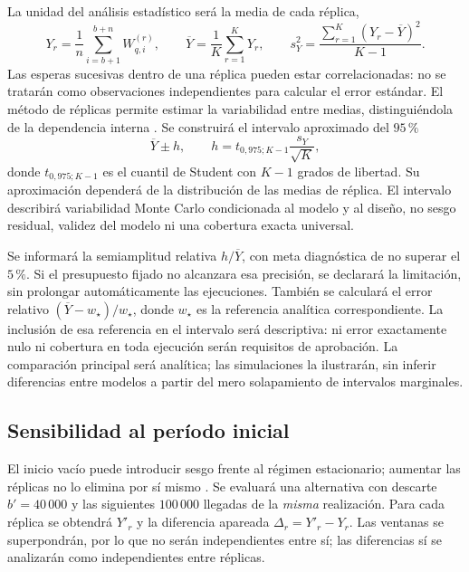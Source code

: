 La unidad del análisis estadístico será la media de cada réplica,
\begin{equation}
  Y_r=\frac{1}{n}\sum_{i=b+1}^{b+n}W_{q,i}^{(r)},\qquad
  \overline{Y}=\frac{1}{K}\sum_{r=1}^{K}Y_r,\qquad
  s_Y^2=\frac{\sum_{r=1}^{K}(Y_r-\overline{Y})^2}{K-1}.
  \label{eq:metodo-estimadores}
\end{equation}
Las esperas sucesivas dentro de una réplica pueden estar correlacionadas: no se tratarán como observaciones independientes para calcular el error estándar. El método de réplicas permite estimar la variabilidad entre medias, distinguiéndola de la dependencia interna \cite{banksAnalisisSalidas}. Se construirá el intervalo aproximado del $95\,\%$
\begin{equation}
  \overline{Y}\pm h,\qquad
  h=t_{0{,}975;K-1}\frac{s_Y}{\sqrt{K}},
  \label{eq:metodo-intervalo}
\end{equation}
donde $t_{0{,}975;K-1}$ es el cuantil de Student con $K-1$ grados de libertad. Su aproximación dependerá de la distribución de las medias de réplica. El intervalo describirá variabilidad Monte Carlo condicionada al modelo y al diseño, no sesgo residual, validez del modelo ni una cobertura exacta universal.

Se informará la semiamplitud relativa $h/\overline{Y}$, con meta diagnóstica de no superar el $5\,\%$. Si el presupuesto fijado no alcanzara esa precisión, se declarará la limitación, sin prolongar automáticamente las ejecuciones. También se calculará el error relativo $(\overline{Y}-w_\star)/w_\star$, donde $w_\star$ es la referencia analítica correspondiente. La inclusión de esa referencia en el intervalo será descriptiva: ni error exactamente nulo ni cobertura en toda ejecución serán requisitos de aprobación. La comparación principal será analítica; las simulaciones la ilustrarán, sin inferir diferencias entre modelos a partir del mero solapamiento de intervalos marginales.

\subsection{Sensibilidad al período inicial}
\label{subsec:metodo-inicializacion}

El inicio vacío puede introducir sesgo frente al régimen estacionario; aumentar las réplicas no lo elimina por sí mismo \cite{banksAnalisisSalidas}. Se evaluará una alternativa con descarte $b'=40\,000$ y las siguientes $100\,000$ llegadas de la \emph{misma} realización. Para cada réplica se obtendrá $Y'_r$ y la diferencia apareada $\Delta_r=Y'_r-Y_r$. Las ventanas se superpondrán, por lo que no serán independientes entre sí; las diferencias sí se analizarán como independientes entre réplicas.

